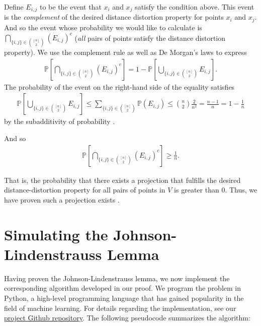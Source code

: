 \documentclass{article}
\begin{document}
Define $E_{i, j}$ to be the event that $x_i$ and $x_j$ satisfy the condition above. This event is the \textit{complement} of the desired distance distortion property for points $x_i$ and $x_j$. And so the event whose probability we would like to calculate is $\bigcap_{ \{i, j\} \in \binom{[n]}{2}} (E_{i, j})^c$ (\textit{all} pairs of points satisfy the distance distortion property). We use the complement rule as well as De Morgan's laws to express
\begin{align*}
    \mathbb{P} \left[\bigcap_{ \{i, j\} \in \binom{[n]}{2}} (E_{i, j})^c \right] = 1 - \mathbb{P} \left[\bigcup_{ \{i, j\} \in \binom{[n]}{2}} E_{i, j} \right].
\end{align*}
The probability of the event on the right-hand side of the equality satisfies
\begin{align*}
    \mathbb{P} \left[\bigcup_{ \{i, j\} \in \binom{[n]}{2}} E_{i, j} \right] \leq \sum_{ \{i, j\} \in \binom{[n]}{2}} \mathbb{P}(E_{i,j}) \leq \binom{n}{2} \frac{2}{n^2} = \frac{n-1}{n} = 1 - \frac{1}{n}
\end{align*}
by the subadditivity of probability \cite{pollard_2001}.

And so
\begin{align*}
    \mathbb{P} \left[\bigcap_{ \{i, j\} \in \binom{[n]}{2}} (E_{i, j})^c \right] \geq \frac{1}{n}.
\end{align*}

That is, the probability that there exists a projection that fulfills the desired distance-distortion property for all pairs of points in $V$ is greater than 0. Thus, we have proven such a projection exists \cite{Mahoney09}.

\newpage
\section{Simulating the Johnson-Lindenstrauss Lemma}

Having proven the Johnson-Lindenstrauss lemma, we now implement the corresponding algorithm developed in our proof. We program the problem in Python, a high-level programming language that has gained popularity in the field of machine learning. For details regarding the implementation, see our \href{https://github.com/smithhenryd/Johnson-Lindenstrauss}{project Github repository}. The following pseudocode summarizes the algorithm:
\end{document}
